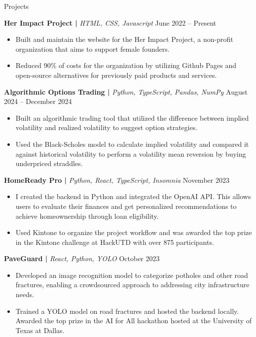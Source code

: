 \documentclass[]{mcdowellcv}
\begin{document}
	\begin{cvsection}{Projects}
		\begin{cvsubsection}{}{}{}	
				\textbf{Her Impact Project | }\textit{HTML, CSS, Javascript} \hfill{June 2022 -- Present}
				\begin{itemize}
					\item Built and maintain the website for the Her Impact Project, a non-profit organization that aims to support female founders.
					\smallskip
					\item Reduced 90\% of costs for the organization by utilizing Github Pages and open-source alternatives for previously paid products and services.
				\end{itemize}
				\medskip
				\textbf{Algorithmic Options Trading | }\textit{Python, TypeScript, Pandas, NumPy} \hfill{August 2024 -- December 2024}
				\begin{itemize}
					\item Built an algorithmic trading tool that utilized the difference between implied volatility and realized volatility to suggest option strategies.
					\smallskip
					\item Used the Black-Scholes model to calculate implied volatility and compared it against historical volatility to perform a volatility mean reversion by buying underpriced straddles.
				\end{itemize}
				\medskip
				\textbf{HomeReady Pro | }\textit{Python, React, TypeScript, Insomnia} \hfill{November 2023} 
				\begin{itemize}
					\item I created the backend in Python and integrated the OpenAI API. This allows users to evaluate their finances and get personalized recommendations to achieve homeownership through loan eligibility. 
					\smallskip
					\item Used Kintone to organize the project workflow and was awarded the top prize in the Kintone challenge at HackUTD with over 875 participants.
				\end{itemize}
				\medskip
				\textbf{PaveGuard | }\textit{React, Python, YOLO} \hfill{October 2023}
				\begin{itemize}
					\item Developed an image recognition model to categorize potholes and other road fractures, enabling a crowdsourced approach to addressing city infrastructure needs.
					\smallskip
					\item Trained a YOLO model on road fractures and hosted the backend locally. Awarded the top prize in the AI for All hackathon hosted at the University of Texas at Dallas.
				\end{itemize}
		\end{cvsubsection}
	\end{cvsection}
\end{document}
